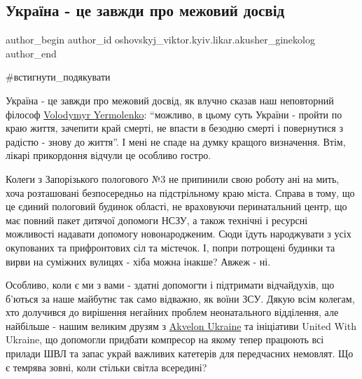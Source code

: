 
 
 
 
 

\subsection{Україна - це завжди про межовий досвід}
\label{sec:30_12_2022.fb.oshovskyj_viktor.kyiv.likar.akusher_ginekolog.1.ukra_na___tse_zavzhd}

\ifcmt
 author_begin
   author_id oshovskyj_viktor.kyiv.likar.akusher_ginekolog
 author_end
\fi

\#встигнути\_подякувати

Україна - це завжди про межовий досвід, як влучно сказав наш неповторний
філософ \href{https://www.facebook.com/volodymyr.yermolenko}{Volodymyr Yermolenko}: \enquote{можливо, в цьому суть України - пройти по краю
життя, зачепити край смерті, не впасти в безодню смерті і повернутися з радістю
- знову до життя}. І мені не спаде на думку кращого визначення. Втім, лікарі
прикордоння відчули це особливо гостро. 

Колеги з Запорізького пологового №3 не припинили свою роботу ані на мить, хоча
розташовані безпосередньо на підстрільному краю міста. Справа в тому, що це
єдиний пологовий будинок області, не враховуючи перинатальний центр, що має
повний пакет дитячої допомоги НСЗУ, а також технічні і ресурсні можливості
надавати допомогу новонародженим. Сюди їдуть народжувати з усіх окупованих та
прифронтових сіл та містечок. І, попри потрощені будинки та вирви на суміжних
вулицях - хіба можна інакше? Авжеж - ні. 

Особливо, коли є ми з вами - здатні допомогти і підтримати відчайдухів, що
б'ються за наше майбутнє так само відважно, як воїни ЗСУ. Дякую всім колегам,
хто долучився до вирішення негайних проблем неонатального відділення, але
найбільше - нашим великим друзям з
\href{https://www.facebook.com/AkvelonUkraine}{Akvelon Ukraine} та ініціативи
United With Ukraine, що допомогли придбати компресор на якому тепер працюють
всі прилади ШВЛ та запас украй важливих катетерів для передчасних немовлят. Що
є темрява зовні, коли стільки світла всередині? 

